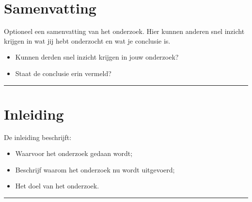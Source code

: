 \documentclass[a4paper, 11pt, oneside]{report}
\begin{document}
\tableofcontents
\clearpage






\chapter*{Samenvatting}

Optioneel een samenvatting van het onderzoek. Hier kunnen anderen snel inzicht krijgen in wat jij hebt onderzocht en wat je conclusie is.
\begin{itemize}
	\item Kunnen derden snel inzicht krijgen in jouw onderzoek?
	\item Staat de conclusie erin vermeld?
\end{itemize}
\hrule

\chapter{Inleiding}
\label{chapter:inleiding}


De inleiding beschrijft:
\begin{itemize}
\item Waarvoor het onderzoek gedaan wordt;
\item Beschrijf waarom het onderzoek nu wordt uitgevoerd;
\item Het doel van het onderzoek.
\end{itemize}
\hrule
\end{document}
